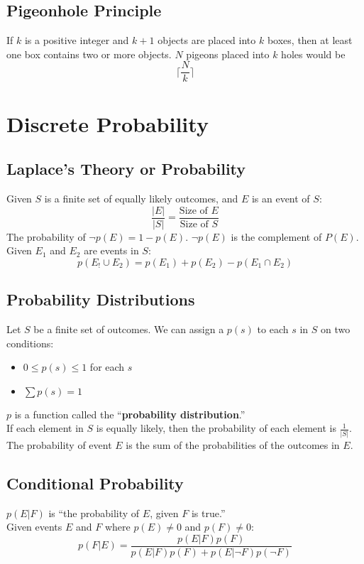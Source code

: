 \documentclass[letter]{article}
\begin{document}
\begin{multicols}{2}
  \subsection{Pigeonhole Principle}
  If $k$ is a positive integer and $k + 1$ objects are placed into $k$ boxes,
  then at least one box contains two or more objects. $N$ pigeons placed into
  $k$ holes would be
  $$\lceil\dfrac{N}{k}\rceil$$

  \section{Discrete Probability}

  \subsection{Laplace's Theory or Probability}
  Given $S$ is a finite set of equally likely outcomes, and $E$ is an event of
  $S$:
  $$\frac{|E|}{|S|} = \frac{\text{Size of } E}{\text{Size of } S}$$
  The probability of $\neg p(E) = 1 - p(E)$. $\neg p(E)$ is the complement of
  $P(E)$. \\
  Given $E_1$ and $E_2$ are events in $S$:
  $$p(E_! \cup E_2) = p(E_1) + p(E_2) - p(E_1 \cap E_2)$$

  \subsection{Probability Distributions}
  Let $S$ be a finite set of outcomes. We can assign a $p(s)$ to each $s$ in $S$
  on two conditions:
  \begin{itemize}
    \item $0 \leq p(s) \leq 1$ for each $s$
    \item $\sum{p(s)} = 1$
  \end{itemize}
  $p$ is a function called the ``\textbf{probability distribution}.'' \\
  If each element in $S$ is equally likely, then the probability of each element
  is $\frac{1}{|S|}$. \\
  The probability of event $E$ is the sum of the probabilities of the outcomes in
  $E$.

  \subsection{Conditional Probability}
  $p(E|F)$ is ``the probability of $E$, given $F$ is true.'' \\
  Given events $E$ and $F$ where $p(E) \neq 0$ and $p(F) \neq 0$:
  $$p(F|E) = \frac{p(E|F)p(F)}{p(E|F)p(F) + p(E|\neg F)p(\neg F)}$$


\end{multicols}
\end{document}
